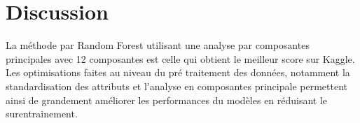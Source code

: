 \documentclass[12pt]{article}
\begin{document}
\section*{Discussion}

La méthode par Random Forest utilisant une analyse par composantes principales avec 12 composantes est celle qui obtient le meilleur score sur Kaggle. Les optimisations faites au niveau du pré traitement des données, notamment la standardisation des attributs et l'analyse en composantes principale permettent ainsi de grandement améliorer les performances du modèles en réduisant le surentrainement.
\end{document}
